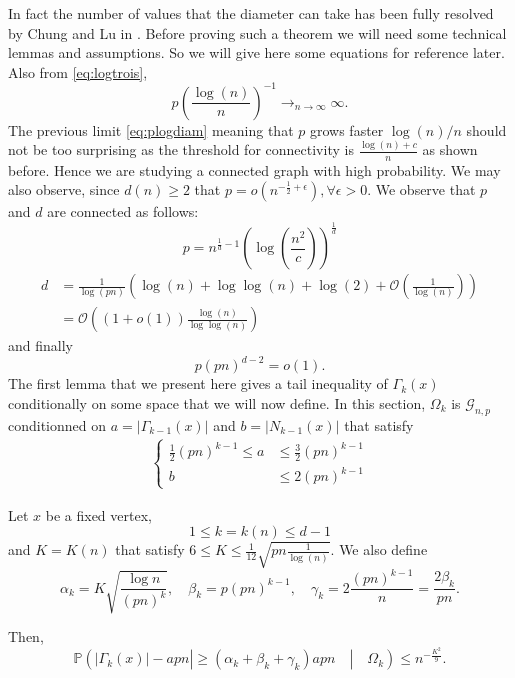 In fact the number of values that the diameter can take has been fully resolved by Chung and Lu in \cite{ChungLu01}.
\newline
Before proving such a theorem we will need some technical lemmas and assumptions. So we will give here some equations for reference later.
Also from \eqref{eq:logtrois},
\begin{equation}\label{eq:plogdiam}
	p (\frac{\log(n)}{n})^{-1} \longrightarrow_{n \to \infty} \infty.
\end{equation}
The previous limit \eqref{eq:plogdiam} meaning that $p$ grows faster $\log(n)/n$ should not be too surprising as the threshold for connectivity is $\frac{\log(n) + c}{n}$ as shown before.
Hence we are studying a connected graph with high probability.
We may also observe, since $d(n) \geq 2$ that $p = o(n^{-\frac{1}{2} +\epsilon}), \forall \epsilon > 0$.
We observe that $p$ and $d$ are connected as follows:
\begin{equation}
	p=n^{\frac{1}{d} - 1}(\log(\frac{n^2}{c}))^\frac{1}{d}
\end{equation}
\begin{align}\label{eq:pnd}
	d &= \frac{1}{\log(pn)}(\log(n) + \log \log (n) + \log(2) + \mathcal{O}(\frac{1}{\log(n)}))\\
	  &= \mathcal{O}((1+o(1))\frac{\log(n)}{\log\log(n)})
\end{align}
and finally
\begin{equation}
	p(pn)^{d-2} = o(1).
\end{equation}
The first lemma that we present here gives a tail inequality of $\Gamma_k(x)$ conditionally on some space that we will now define. 
In this section, $\Omega_k$ is $\mathcal{G}_{n, p}$ conditionned on $a = |\Gamma_{k-1}(x)|$ and $b = |N_{k-1}(x)|$ that satisfy
\begin{align}\label{eq:CondAB}
 \left\{\begin{array}{rl}
		 \frac{1}{2}(pn)^{k-1} \leq a &\leq \frac{3}{2}(pn)^{k-1} \\
		 			    b &\leq 2(pn)^{k-1}
	 \end{array}
	\right.
\end{align}
\begin{lemma}
	Let $x$ be a fixed vertex,
	\begin{equation}
		1 \leq k = k(n)  \leq d-1
	\end{equation}
	and $ K = K(n)$ that satisfy $ 6 \leq K \leq \frac{1}{12} \sqrt{pn\frac{1}{\log(n)}}$.
	We also define
	\begin{equation}
		\alpha_k = K\sqrt{\frac{\log{n}}{(pn)^k}} , \quad \beta_k = p(pn)^{k-1}, \quad \gamma_k = 2\frac{(pn)^{k-1}}{n} = \frac{2\beta_k}{pn}.
	\end{equation}

	Then,
	\begin{equation}
		\mathbb{P}(|\Gamma_k(x)| - apn| \geq (\alpha_k + \beta_k + \gamma_k)apn \quad|\quad \Omega_k) \leq n^{-\frac{K^2}{9}}.
	\end{equation}
\end{lemma}


